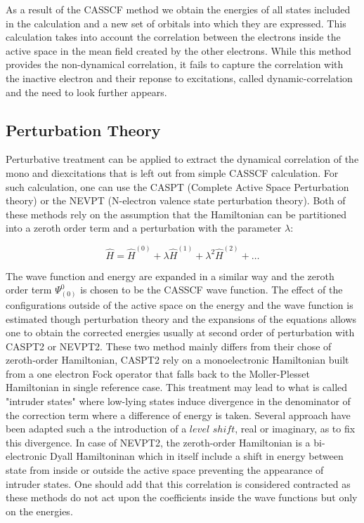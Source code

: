 \documentclass[10pt]{report}
\numberwithin{equation}{section}
\begin{document}
As a result of the CASSCF method we obtain the energies of all states included in the calculation and a new set of orbitals into which they are expressed. 
This calculation takes into account the correlation between the electrons inside the active space in the mean field created by the other electrons. 
While this method provides the non-dynamical correlation, it fails to capture the correlation with the inactive electron and their reponse to excitations, called dynamic-correlation and the need to look further appears.


\subsection{Perturbation Theory}

Perturbative treatment can be applied to extract the dynamical correlation of the mono and diexcitations that is left out from simple CASSCF calculation. For such calculation, one can use the CASPT (Complete Active Space Perturbation theory)
or the NEVPT (N-electron valence state perturbation theory). Both of these methods rely on the assumption that the Hamiltonian can be partitioned into a zeroth order term and a perturbation with the parameter $\lambda$:

\begin{equation}
    \hat{H}=\hat{H}^{(0)}+\lambda\hat{H}^{(1)}+\lambda^2 \hat{H}^{(2)}+\ldots
\end{equation}


The wave function and energy are expanded in a similar way and the zeroth order term $\Psi_{(0)}^{0}$ is chosen to be the CASSCF wave function. 
The effect of the configurations outside of the active space on the energy and the wave function is estimated though perturbation theory and the expansions of the equations allows one to obtain the corrected energies
usually at second order of perturbation with CASPT2 or NEVPT2. These two method mainly differs from their chose of zeroth-order Hamiltonian, CASPT2 rely on a monoelectronic Hamiltonian built from a one electron Fock operator that falls back to the Moller-Plesset Hamiltonian in single reference case. 
This treatment may lead to what is called "intruder states" where low-lying states induce divergence in the denominator of the correction term where a difference of energy is taken. Several approach have been adapted such a the introduction of a $level$ $shift$, real or imaginary, as to fix this divergence.
In case of NEVPT2, the zeroth-order Hamiltonian is a bi-electronic Dyall Hamiltoninan which in itself include a shift in energy between state from inside or outside the active space preventing the appearance of intruder states.
One should add that this correlation is considered contracted as these methods do not act upon the coefficients inside the wave functions but only on the energies.
\end{document}
